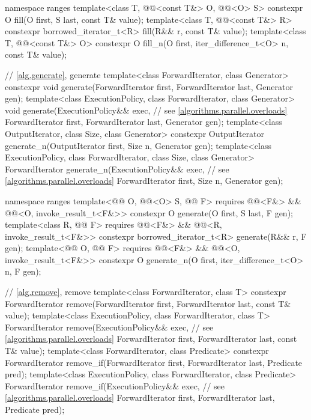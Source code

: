\begin{codeblock}
{  namespace ranges {
    template<class T, @@<const T&> O, @@<O> S>
      constexpr O fill(O first, S last, const T& value);
    template<class T, @@<const T&> R>
      constexpr borrowed_iterator_t<R> fill(R&& r, const T& value);
    template<class T, @@<const T&> O>
      constexpr O fill_n(O first, iter_difference_t<O> n, const T& value);
  }

  // \ref{alg.generate}, generate
  template<class ForwardIterator, class Generator>
    constexpr void generate(ForwardIterator first, ForwardIterator last,
                            Generator gen);
  template<class ExecutionPolicy, class ForwardIterator, class Generator>
    void generate(ExecutionPolicy&& exec,                       // see \ref{algorithms.parallel.overloads}
                  ForwardIterator first, ForwardIterator last,
                  Generator gen);
  template<class OutputIterator, class Size, class Generator>
    constexpr OutputIterator generate_n(OutputIterator first, Size n, Generator gen);
  template<class ExecutionPolicy, class ForwardIterator, class Size, class Generator>
    ForwardIterator generate_n(ExecutionPolicy&& exec,          // see \ref{algorithms.parallel.overloads}
                               ForwardIterator first, Size n, Generator gen);

  namespace ranges {
    template<@@ O, @@<O> S, @@ F>
      requires @@<F&> && @@<O, invoke_result_t<F&>>
      constexpr O generate(O first, S last, F gen);
    template<class R, @@ F>
      requires @@<F&> && @@<R, invoke_result_t<F&>>
      constexpr borrowed_iterator_t<R> generate(R&& r, F gen);
    template<@@ O, @@ F>
      requires @@<F&> && @@<O, invoke_result_t<F&>>
      constexpr O generate_n(O first, iter_difference_t<O> n, F gen);
  }

  // \ref{alg.remove}, remove
  template<class ForwardIterator, class T>
    constexpr ForwardIterator remove(ForwardIterator first, ForwardIterator last,
                                     const T& value);
  template<class ExecutionPolicy, class ForwardIterator, class T>
    ForwardIterator remove(ExecutionPolicy&& exec,              // see \ref{algorithms.parallel.overloads}
                           ForwardIterator first, ForwardIterator last,
                           const T& value);
  template<class ForwardIterator, class Predicate>
    constexpr ForwardIterator remove_if(ForwardIterator first, ForwardIterator last,
                                        Predicate pred);
  template<class ExecutionPolicy, class ForwardIterator, class Predicate>
    ForwardIterator remove_if(ExecutionPolicy&& exec,           // see \ref{algorithms.parallel.overloads}
                              ForwardIterator first, ForwardIterator last,
                              Predicate pred);

}
\end{codeblock}
